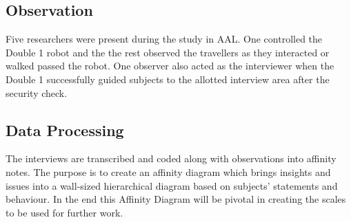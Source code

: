  \subsection{Observation}
Five researchers were present during the study in AAL. One controlled the Double 1 robot and the the rest observed the travellers as they interacted or walked passed the robot. One observer also acted as the interviewer when the Double 1 successfully guided subjects to the allotted interview area after the security check. 


\subsection{Data Processing}
The interviews are transcribed and coded along with observations into affinity notes. The purpose is to create an affinity diagram \cite{Holtzblatt2005} which brings insights and issues into a wall-sized hierarchical diagram based on subjects' statements and behaviour. In the end this Affinity Diagram will be pivotal in creating the scales to be used for further work.










